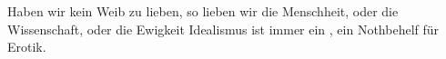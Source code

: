 Haben wir kein Weib zu lieben, so lieben wir die Menschheit, oder die Wissenschaft, oder die Ewigkeit  Idealismus ist immer ein , ein Nothbehelf für Erotik.
\par

